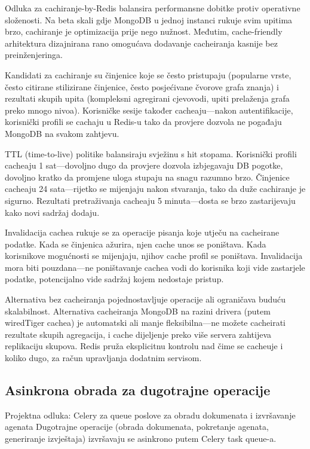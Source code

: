 \documentclass[12pt,a4paper]{article}
\begin{document}
Odluka za cachiranje-by-Redis balansira performansne dobitke protiv operativne složenosti. Na beta skali gdje MongoDB u jednoj instanci rukuje svim upitima brzo, cachiranje je optimizacija prije nego nužnost. Međutim, cache-friendly arhitektura dizajnirana rano omogućava dodavanje cacheiranja kasnije bez preinženjeringa.

Kandidati za cachiranje su činjenice koje se često pristupaju (popularne vrste, često citirane stilizirane činjenice, često posjećivane čvorove grafa znanja) i rezultati skupih upita (kompleksni agregirani cjevovodi, upiti prelaženja grafa preko mnogo nivoa). Korisničke sesije također cacheaju—nakon autentifikacije, korisnički profili se cachaju u Redis-u tako da provjere dozvola ne pogađaju MongoDB na svakom zahtjevu.

TTL (time-to-live) politike balansiraju svježinu s hit stopama. Korisnički profili cacheaju 1 sat—dovoljno dugo da provjere dozvola izbjegavaju DB pogotke, dovoljno kratko da promjene uloga stupaju na snagu razumno brzo. Činjenice cacheaju 24 sata—rijetko se mijenjaju nakon stvaranja, tako da duže cachiranje je sigurno. Rezultati pretraživanja cacheaju 5 minuta—dosta se brzo zastarijevaju kako novi sadržaj dodaju.

Invalidacija cachea rukuje se za operacije pisanja koje utječu na cacheirane podatke. Kada se činjenica ažurira, njen cache unos se poništava. Kada korisnikove mogućnosti se mijenjaju, njihov cache profil se poništava. Invalidacija mora biti pouzdana—ne poništavanje cachea vodi do korisnika koji vide zastarjele podatke, potencijalno vide sadržaj kojem nedostaje pristup.

Alternativa bez cacheiranja pojednostavljuje operacije ali ograničava buduću skalabilnost. Alternativa cacheiranja MongoDB na razini drivera (putem wiredTiger cachea) je automatski ali manje fleksibilna—ne možete cacheirati rezultate skupih agregacija, i cache dijeljenje preko više servera zahtijeva replikaciju skupova. Redis pruža eksplicitnu kontrolu nad čime se cacheuje i koliko dugo, za račun upravljanja dodatnim servisom.

\subsection{Asinkrona obrada za dugotrajne operacije}

\begin{rationale}{Projektna odluka: Celery za queue poslove za obradu dokumenata i izvršavanje agenata}
Dugotrajne operacije (obrada dokumenata, pokretanje agenata, generiranje izvještaja) izvršavaju se asinkrono putem Celery task queue-a.
\end{rationale}
\end{document}
